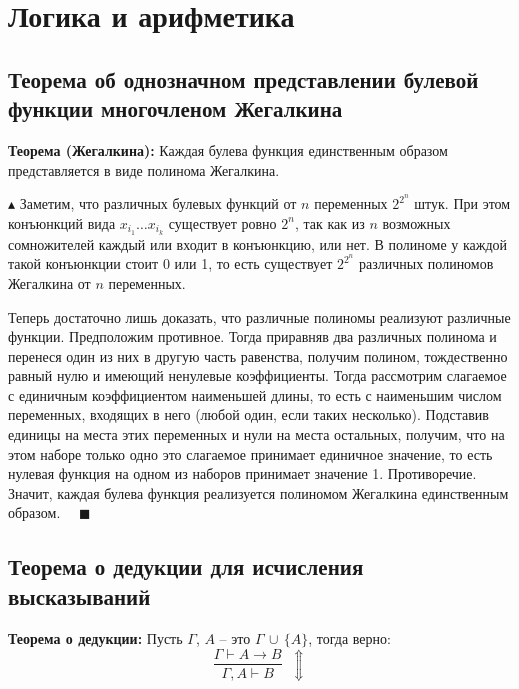 \setcounter{section}{0}
\section{Логика и арифметика}

\subsection{Теорема об однозначном представлении булевой функции многочленом Жегалкина}
\textbf{Теорема (Жегалкина):} Каждая булева функция единственным образом представляется в виде полинома Жегалкина.

$\blacktriangle$ Заметим, что различных булевых функций от $n$ переменных $2^{2^n}$ штук. При этом конъюнкций вида $x_{i_1}\ldots x_{i_k}$ существует ровно $2^n$, так как из $n$ возможных сомножителей каждый или входит в конъюнкцию, или нет. В полиноме у каждой такой конъюнкции стоит 0 или 1, то есть существует $2^{2^n}$ различных полиномов Жегалкина от $n$ переменных.

Теперь достаточно лишь доказать, что различные полиномы реализуют различные функции. Предположим противное. Тогда приравняв два различных полинома и перенеся один из них в другую часть равенства, получим полином, тождественно равный нулю и имеющий ненулевые коэффициенты. Тогда рассмотрим слагаемое с единичным коэффициентом наименьшей длины, то есть с наименьшим числом переменных, входящих в него (любой один, если таких несколько). Подставив единицы на места этих переменных и нули на места остальных, получим, что на этом наборе только одно это слагаемое принимает единичное значение, то есть нулевая функция на одном из наборов принимает значение 1. Противоречие. Значит, каждая булева функция реализуется полиномом Жегалкина единственным образом. $\quad \blacksquare$ 

\subsection{Теорема о дедукции для исчисления высказываний}

\textbf{Теорема о дедукции:} Пусть $\Gamma$, $A$ -- это $\Gamma \,\cup\, \{A\}$, тогда верно:
$$\frac{\Gamma\vdash A\to B}{\Gamma,A\vdash B}\;\;\Updownarrow$$


